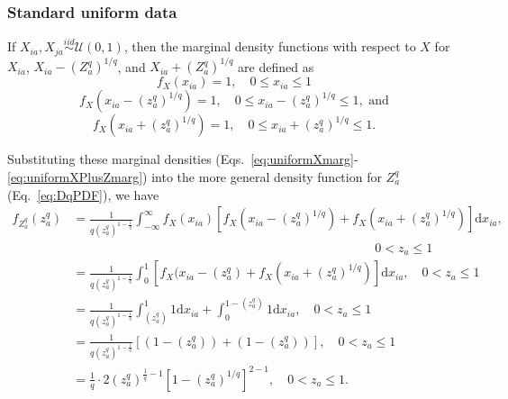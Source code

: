 \documentclass[10pt,letterpaper]{article}
\begin{document}
\subsubsection*{Standard uniform data}

If $X_{ia},X_{ja} \overset{iid}{\sim} \mathcal{U}(0,1)$, then the marginal density functions with respect to $X$ for $X_{ia}$, $X_{ia} - \left(Z^q_a\right)^{1/q}$, and $X_{ia} + \left(Z^q_a\right)^{1/q}$ are defined as
%
\begin{equation}\label{eq:uniformXmarg}
f_X(x_{ia}) = 1, \quad 0 \leq x_{ia} \leq 1
\end{equation}
%
\begin{equation}\label{eq:uniformXMinusZmarg}
f_X\left(x_{ia} - \left(z^q_a\right)^{1/q}\right) = 1, \quad 0 \leq x_{ia} - \left(z^q_a\right)^{1/q} \leq 1, \text{ and}
\end{equation}
%
\begin{equation}\label{eq:uniformXPlusZmarg}
f_X\left(x_{ia} + \left(z^q_a\right)^{1/q}\right) = 1, \quad 0 \leq x_{ia} + \left(z^q_a\right)^{1/q} \leq 1.
\end{equation}

Substituting these marginal densities (Eqs.~\ref{eq:uniformXmarg}-\ref{eq:uniformXPlusZmarg}) into the more general density function for $Z^q_a$ (Eq.~\ref{eq:DqPDF}), we have
%
\begin{equation}\label{eq:uniformDqPDF}
\begin{aligned}
f_{Z^q_a}(z^q_a) &= \frac{1}{q\left(z^q_a\right)^{1 - \frac{1}{q}}}\int_{-\infty}^{\infty}f_X(x_{ia})\left[f_X\left(x_{ia} - \left(z^q_a\right)^{1/q}\right) + f_X\left(x_{ia} + \left(z^q_a\right)^{1/q}\right)\right]\text{d}x_{ia},\\
& \hspace{4in} 0 < z_a \leq 1\\
&= \frac{1}{q\left(z^q_a\right)^{1 - \frac{1}{q}}}\int_{0}^{1}\left[f_X(x_{ia} - \left(z^q_a\right) + f_X\left(x_{ia} + \left(z^q_a\right)^{1/q}\right)\right]\text{d}x_{ia}, \quad 0 < z_a \leq 1 \\
&= \frac{1}{q\left(z^q_a\right)^{1 - \frac{1}{q}}}\int_{\left(z^q_a\right)}^{1}1\text{d}x_{ia} + \int_{0}^{1 - \left(z^q_a\right)}1\text{d}x_{ia}, \quad 0 < z_a \leq 1 \\
&= \frac{1}{q\left(z^q_a\right)^{1 - \frac{1}{q}}}\left[\left(1 - \left(z^q_a\right)\right) + \left(1 - \left(z^q_a\right)\right)\right], \quad 0 < z_a \leq 1 \\
&= \frac{1}{q} \cdot 2 \left(z^q_a\right)^{\frac{1}{q} - 1}\left[1 - \left(z^q_a\right)^{1/q}\right]^{2 - 1}, \quad 0 < z_a \leq 1.
\end{aligned}
\end{equation}
\end{document}
